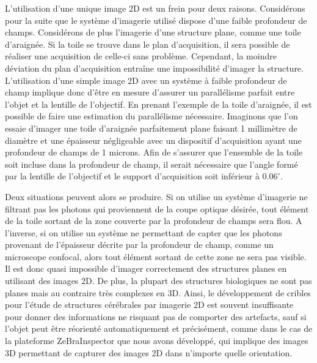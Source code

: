 \documentclass[\main/main.tex]{subfiles}
\begin{document}
%
L'utilisation d'une unique image 2D est un frein pour deux raisons.
%
Considérons pour la suite que le système d'imagerie utilisé dispose d'une faible profondeur de champs.
%
Considérons de plus l'imagerie d'une structure plane, comme une toile d'araignée.
%
Si la toile se trouve dans le plan d'acquisition, il sera possible de réaliser une acquisition de celle-ci sans problème.
%
Cependant, la moindre déviation du plan d'acquisition entraîne une impossibilité d'imager la structure.
%
L'utilisation d'une simple image 2D avec un système à faible profondeur de champ implique donc d'être en mesure d'assurer un parallélisme parfait entre l'objet et la lentille de l'objectif.
%
En prenant l'exemple de la toile d'araignée, il est possible de faire une estimation du parallélisme nécessaire.
%
Imaginons que l'on essaie d'imager une toile d'araignée parfaitement plane
faisant 1 millimètre de diamètre et une épaisseur négligeable
avec un dispositif d'acquisition ayant une profondeur de champs de 1 microns.
%
Afin de s'assurer que l'ensemble de la toile soit incluse dans la profondeur de champ, il serait nécessaire que l'angle formé par la lentille de l'objectif et le support d'acquisition soit inférieur à $0.06^{\circ}$.

Deux situations peuvent alors se produire.
%
Si on utilise un système d'imagerie ne filtrant pas les photons qui proviennent de la coupe optique désirée, tout élément de la toile sortant de la zone couverte par la profondeur de champs sera flou.
%
A l'inverse, si on utilise un système ne permettant de capter que les photons provenant de l'épaisseur décrite par la profondeur de champ, comme un microscope confocal, alors tout élément sortant de cette zone ne sera pas visible.
%
Il est donc quasi impossible d'imager correctement des structures planes en utilisant des images 2D.
%
De plus, la plupart des structures biologiques ne sont pas planes mais au contraire très complexes en 3D.
%
Ainsi, le développement de cribles pour l'étude de structures cérébrales par imagerie 2D est souvent insuffisante pour donner des informations ne risquant pas de comporter des artefacts, sauf si l'objet peut être réorienté automatiquement et précisément, comme dans le cas de la plateforme ZeBraInspector que nous avons développé, qui implique des images 3D permettant de capturer des images 2D dans n'importe quelle orientation.
\end{document}
